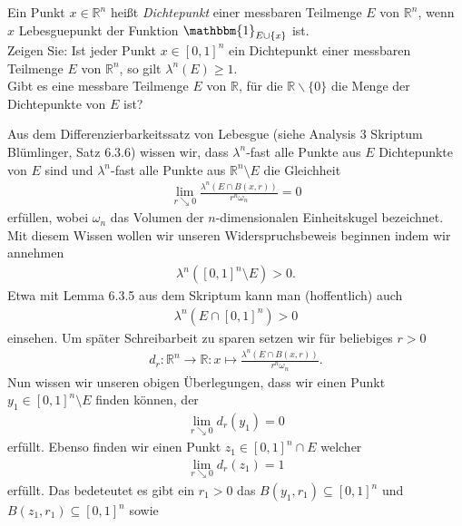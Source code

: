 \begin{exercise}

Ein Punkt $x \in \mathbb{R}^n$ heißt \textit{Dichtepunkt} einer messbaren Teilmenge $E$ von $\mathbb{R}^n$, wenn $x$ Lebesguepunkt der Funktion $\mathbbm{1}_{E\cup\{x\}}$ ist. \\

Zeigen Sie: Ist jeder Punkt $x \in [0,1]^n$ ein Dichtepunkt einer messbaren Teilmenge $E$ von $\mathbb{R}^n$, so gilt $\lambda^n(E) \geq 1$. \\

Gibt es eine messbare Teilmenge $E$ von $\mathbb{R}$, für die $\mathbb{R}\backslash\{0\}$ die Menge der Dichtepunkte von $E$ ist?

\end{exercise}

\begin{solution}
Aus dem Differenzierbarkeitssatz von Lebesgue (siehe Analysis 3 Skriptum Blümlinger, Satz 6.3.6) wissen wir, dass $\lambda^n$-fast alle Punkte aus $E$ Dichtepunkte von $E$ sind und $\lambda^n$-fast alle Punkte aus $\mathbb{R}^n\setminus E$ die Gleichheit 
\begin{align*}
    \lim_{r\searrow 0}\frac{\lambda^n(E\cap B(x,r))}{r^n\omega_n}=0
\end{align*}
erfüllen, wobei $\omega_n$ das Volumen der $n$-dimensionalen Einheitskugel bezeichnet. Mit diesem Wissen wollen wir unseren Widerspruchsbeweis beginnen indem wir annehmen
\begin{align*}
    \lambda^n([0,1]^n\setminus E)>0.
\end{align*}
Etwa mit Lemma 6.3.5 aus dem Skriptum kann man (hoffentlich) auch
\begin{align*}
    \lambda^n(E\cap[0,1]^n)>0
\end{align*}
einsehen. Um später Schreibarbeit zu sparen setzen wir für beliebiges $r>0$
\begin{align*}
    d_r:\mathbb{R}^n\to\mathbb{R}:x\mapsto\frac{\lambda^n(E\cap B(x,r))}{r^n\omega_n}.
\end{align*}
Nun wissen wir unseren obigen Überlegungen, dass wir einen Punkt $y_1\in [0,1]^n\setminus E$ finden können, der 
\begin{align*}
    \lim_{r\searrow 0}d_r(y_1)=0
\end{align*}
erfüllt. Ebenso finden wir einen Punkt $z_1\in[0,1]^n\cap E$ welcher 
\begin{align*}
    \lim_{r\searrow 0}d_r(z_1)=1
\end{align*}
erfüllt. Das bedeteutet es gibt ein $r_1>0$ das $B(y_1,r_1)\subseteq[0,1]^n$ und $B(z_1,r_1)\subseteq[0,1]^n$ sowie \begin{align*}

\end{align*}
\end{solution}
